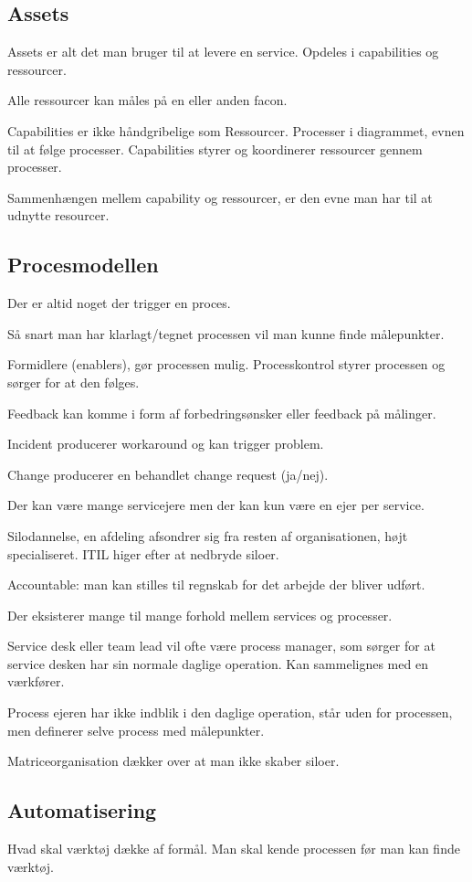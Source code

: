 \subsection{Assets}
Assets er alt det man bruger til at levere en service. Opdeles i capabilities og ressourcer. 

Alle ressourcer kan måles på en eller anden facon.

Capabilities er ikke håndgribelige som Ressourcer. Processer i diagrammet, evnen til at følge processer. Capabilities styrer og koordinerer ressourcer gennem processer.

Sammenhængen mellem capability og ressourcer, er den evne man har til at udnytte resourcer.

\subsection{Procesmodellen}
Der er altid noget der trigger en proces.

Så snart man har klarlagt/tegnet processen vil man kunne finde målepunkter.

Formidlere (enablers), gør processen mulig. Processkontrol styrer processen og sørger for at den følges.

Feedback kan komme i form af forbedringsønsker eller feedback på målinger.

Incident producerer workaround og kan trigger problem.

Change producerer en behandlet change request (ja/nej).

Der kan være mange servicejere men der kan kun være en ejer per service.

Silodannelse, en afdeling afsondrer sig fra resten af organisationen, højt specialiseret. ITIL higer efter at nedbryde siloer.

Accountable: man kan stilles til regnskab for det arbejde der bliver udført.

Der eksisterer mange til mange forhold mellem services og processer.

Service desk eller team lead vil ofte være process manager, som sørger for at service desken har sin normale daglige operation. Kan sammelignes med en værkfører.

Process ejeren har ikke indblik i den daglige operation, står uden for processen, men definerer selve process med målepunkter.

Matriceorganisation dækker over at man ikke skaber siloer.

\subsection{Automatisering}
Hvad skal værktøj dække af formål. Man skal kende processen før man kan finde værktøj. 

